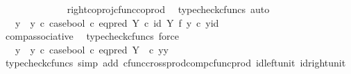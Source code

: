 \begin{isabellebody}
\ \ \ \ \ \ \ \ \ \ \ \ \isamarkupfalse%
\ right{\isacharunderscore}{\kern0pt}coproj{\isacharunderscore}{\kern0pt}cfunc{\isacharunderscore}{\kern0pt}coprod\ \isamarkupfalse%
\ {\isacharparenleft}{\kern0pt}typecheck{\isacharunderscore}{\kern0pt}cfuncs{\isacharcomma}{\kern0pt}\ auto{\isacharparenright}{\kern0pt}\isanewline
\ \ \ \ \ \ \ \ \ \ \isamarkupfalse%
\ \isamarkupfalse%
\ {\isachardoublequoteopen}{\isachardot}{\kern0pt}{\isachardot}{\kern0pt}{\isachardot}{\kern0pt}\ {\isacharequal}{\kern0pt}\ {\isacharparenleft}{\kern0pt}y{}\ {\isasymamalg}\ y{}{\isacharparenright}{\kern0pt}\ {\isasymcirc}\isactrlsub c\ case{\isacharunderscore}{\kern0pt}bool\ {\isasymcirc}\isactrlsub c\ eq{\isacharunderscore}{\kern0pt}pred\ Y\ {\isasymcirc}\isactrlsub c\ {\isacharparenleft}{\kern0pt}id\ Y\ {\isasymtimes}\isactrlsub f\ y{}{\isacharparenright}{\kern0pt}\ {\isasymcirc}\isactrlsub c\ {\isasymlangle}y{}{\isacharcomma}{\kern0pt}id\ {\isasymone}{\isasymrangle}{\isachardoublequoteclose}\isanewline
\ \ \ \ \ \ \ \ \ \ \ \ \isamarkupfalse%
\ comp{\isacharunderscore}{\kern0pt}associative{}\ \isamarkupfalse%
\ {\isacharparenleft}{\kern0pt}typecheck{\isacharunderscore}{\kern0pt}cfuncs{\isacharcomma}{\kern0pt}\ force{\isacharparenright}{\kern0pt}\isanewline
\ \ \ \ \ \ \ \ \ \ \isamarkupfalse%
\ \isamarkupfalse%
\ {\isachardoublequoteopen}{\isachardot}{\kern0pt}{\isachardot}{\kern0pt}{\isachardot}{\kern0pt}\ {\isacharequal}{\kern0pt}\ {\isacharparenleft}{\kern0pt}y{}\ {\isasymamalg}\ y{}{\isacharparenright}{\kern0pt}\ {\isasymcirc}\isactrlsub c\ case{\isacharunderscore}{\kern0pt}bool\ {\isasymcirc}\isactrlsub c\ eq{\isacharunderscore}{\kern0pt}pred\ Y\ \ {\isasymcirc}\isactrlsub c\ {\isasymlangle}y{}{\isacharcomma}{\kern0pt}y{}{\isasymrangle}{\isachardoublequoteclose}\isanewline
\ \ \ \ \ \ \ \ \ \ \ \ \isamarkupfalse%
\ {\isacharparenleft}{\kern0pt}typecheck{\isacharunderscore}{\kern0pt}cfuncs{\isacharcomma}{\kern0pt}\ simp\ add{\isacharcolon}{\kern0pt}\ cfunc{\isacharunderscore}{\kern0pt}cross{\isacharunderscore}{\kern0pt}prod{\isacharunderscore}{\kern0pt}comp{\isacharunderscore}{\kern0pt}cfunc{\isacharunderscore}{\kern0pt}prod\ id{\isacharunderscore}{\kern0pt}left{\isacharunderscore}{\kern0pt}unit{}\ id{\isacharunderscore}{\kern0pt}right{\isacharunderscore}{\kern0pt}unit{}{\isacharparenright}{\kern0pt}\isanewline

\end{isabellebody}
